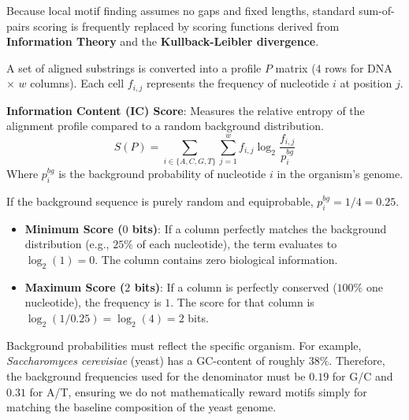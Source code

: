 Because local motif finding assumes no gaps and fixed lengths, standard sum-of-pairs scoring is frequently replaced by scoring functions derived from \textbf{Information Theory} and the \textbf{Kullback-Leibler divergence}.

A set of aligned substrings is converted into a profile $P$ matrix ($4$ rows for DNA $\times$ $w$ columns). Each cell $f_{i,j}$ represents the frequency of nucleotide $i$ at position $j$.

\begin{important}
  \textbf{Information Content (IC) Score}: Measures the relative entropy of the alignment profile compared to a random background distribution. 
  \[
    S(P) = \sum_{i \in \{A,C,G,T\}} \sum_{j=1}^w f_{i,j} \log_2 \frac{f_{i,j}}{p_i^{bg}}
  \]
  Where $p_i^{bg}$ is the background probability of nucleotide $i$ in the organism's genome.
\end{important}

If the background sequence is purely random and equiprobable, $p_i^{bg} = 1/4 = 0.25$. 
\begin{itemize}
  \item \textbf{Minimum Score ($0$ bits)}: If a column perfectly matches the background distribution (e.g., $25\%$ of each nucleotide), the term evaluates to $\log_2(1) = 0$. The column contains zero biological information.
  \item \textbf{Maximum Score ($2$ bits)}: If a column is perfectly conserved ($100\%$ one nucleotide), the frequency is $1$. The score for that column is $\log_2(1 / 0.25) = \log_2(4) = 2$ bits.
\end{itemize}

\sta Background probabilities must reflect the specific organism. For example, \textit{Saccharomyces cerevisiae} (yeast) has a GC-content of roughly $38\%$. Therefore, the background frequencies used for the denominator must be $0.19$ for G/C and $0.31$ for A/T, ensuring we do not mathematically reward motifs simply for matching the baseline composition of the yeast genome.



